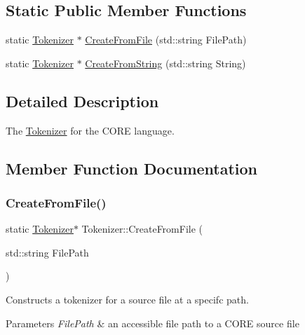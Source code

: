 \subsection*{Static Public Member Functions}
\begin{DoxyCompactItemize}
\item 
static \mbox{\hyperlink{class_tokenizer}{Tokenizer}} $\ast$ \mbox{\hyperlink{class_tokenizer_a94b93d58b0ae1c3bb4a252e1322ffeff}{Create\+From\+File}} (std\+::string File\+Path)
\item 
static \mbox{\hyperlink{class_tokenizer}{Tokenizer}} $\ast$ \mbox{\hyperlink{class_tokenizer_a006144123a37d29a6100c57ea21cde15}{Create\+From\+String}} (std\+::string String)
\end{DoxyCompactItemize}


\subsection{Detailed Description}
The \mbox{\hyperlink{class_tokenizer}{Tokenizer}} for the C\+O\+RE language. 

\subsection{Member Function Documentation}
\mbox{\label{class_tokenizer_a94b93d58b0ae1c3bb4a252e1322ffeff}} 
\subsubsection{\texorpdfstring{CreateFromFile()}{CreateFromFile()}}
{\footnotesize\ttfamily static \mbox{\hyperlink{class_tokenizer}{Tokenizer}}$\ast$ Tokenizer\+::\+Create\+From\+File (\begin{DoxyParamCaption}\item[{std\+::string}]{File\+Path }\end{DoxyParamCaption})\hspace{0.3cm}{\ttfamily [static]}}

Constructs a tokenizer for a source file at a specifc path. 
\begin{DoxyParams}{Parameters}
{\em File\+Path} & an accessible file path to a C\+O\+RE source file \\
\hline
\end{DoxyParams}

